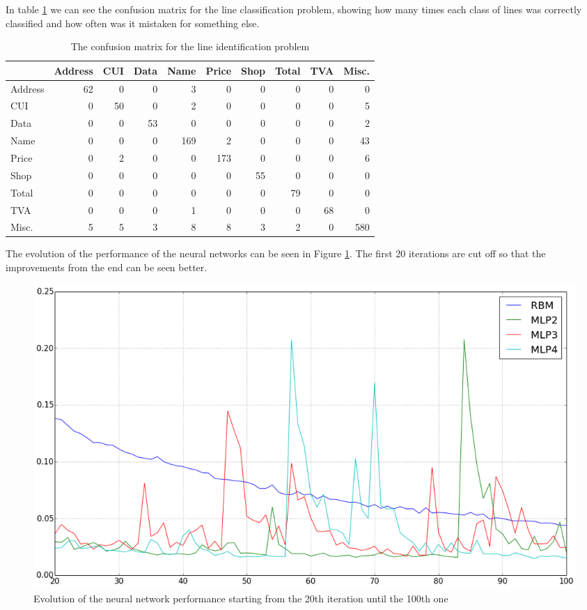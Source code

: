 In table \ref{table:line_identify} we can see the confusion matrix for the line classification problem, showing how many times each class of lines was correctly classified and how often was it mistaken for something else. 

\begin{table}[h]
\caption{The confusion matrix for the line identification problem}
\label{table:line_identify}
\begin{tabular}{lrrrrrrrrr}
\toprule
{} &  Address &  CUI &  Data &  Name &  Price &  Shop &  Total &  TVA &  Misc. \\
\midrule
Address &       62 &    0 &     0 &     3 &      0 &     0 &      0 &    0 &        0 \\
CUI     &        0 &   50 &     0 &     2 &      0 &     0 &      0 &    0 &        5 \\
Data    &        0 &    0 &    53 &     0 &      0 &     0 &      0 &    0 &        2 \\
Name    &        0 &    0 &     0 &   169 &      2 &     0 &      0 &    0 &       43 \\
Price   &        0 &    2 &     0 &     0 &    173 &     0 &      0 &    0 &        6 \\
Shop    &        0 &    0 &     0 &     0 &      0 &    55 &      0 &    0 &        0 \\
Total   &        0 &    0 &     0 &     0 &      0 &     0 &     79 &    0 &        0 \\
TVA     &        0 &    0 &     0 &     1 &      0 &     0 &      0 &   68 &        0 \\
Misc.   &        5 &    5 &     3 &     8 &      8 &     3 &      2 &    0 &      580 \\
\bottomrule
\end{tabular}
\end{table}

The evolution of the performance of the neural networks can be seen in Figure \ref{fig:nn_iteration}. The first 20 iterations are cut off so that the improvements from the end can be seen better. 

\begin{figure}[h!]
\begin{center}
\includegraphics[width=\linewidth]{img/nn_iteration.png}
\caption{\label{fig:nn_iteration}
Evolution of the neural network performance starting from the 20th iteration until the 100th one}
\end{center}
\end{figure}

